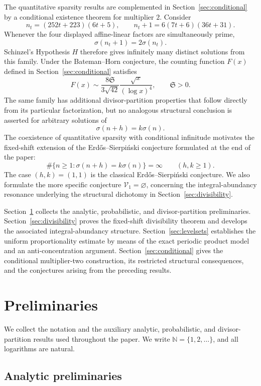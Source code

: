 \documentclass[11pt,reqno]{amsart}
\numberwithin{equation}{section}
\theoremstyle{plain}
\theoremstyle{definition}
\theoremstyle{remark}
\begin{document}
The quantitative sparsity results are complemented in Section~\ref{sec:conditional} by a conditional existence theorem for multiplier $2$. Consider
\[
n_t=(252t+223)(6t+5),
\qquad
n_t+1=6(7t+6)(36t+31).
\]
Whenever the four displayed affine-linear factors are simultaneously prime,
\[
\sigma(n_t+1)=2\sigma(n_t).
\]
Schinzel's Hypothesis $H$ therefore gives infinitely many distinct solutions from this family. Under the Bateman--Horn conjecture, the counting function $F(x)$ defined in
Section~\ref{sec:conditional} satisfies
\[
F(x)
\sim
\frac{8\mathfrak S}{3\sqrt{42}}
\frac{\sqrt{x}}{(\log x)^4},
\qquad
\mathfrak S>0.
\]
The same family has additional divisor-partition properties that follow directly from its particular factorization, but no analogous structural conclusion is asserted for arbitrary solutions of
\[
\sigma(n+h)=k\sigma(n).
\]
The coexistence of quantitative sparsity with conditional infinitude motivates the fixed-shift extension of the Erd\H{o}s--Sierpi\'nski conjecture formulated at the end of the paper:
\[
\#\{n\ge1:\sigma(n+h)=k\sigma(n)\}=\infty
\qquad(h,k\ge1).
\]
The case $(h,k)=(1,1)$ is the classical Erd\H{o}s--Sierpi\'nski conjecture. We also formulate the more specific conjecture $\mathcal V_1=\varnothing$, concerning the integral-abundancy resonance underlying the structural
dichotomy in Section~\ref{sec:divisibility}.

Section~\ref{sec:preliminaries} collects the analytic, probabilistic, and
divisor-partition preliminaries. Section~\ref{sec:divisibility} proves the fixed-shift divisibility theorem and develops the associated integral-abundancy structure. Section~\ref{sec:levelsets} establishes the uniform proportionality estimate
by means of the exact periodic product model and an anti-concentration
argument. Section~\ref{sec:conditional} gives the conditional multiplier-two construction, its restricted structural consequences, and the conjectures arising from the preceding results.

\section{Preliminaries}\label{sec:preliminaries}

We collect the notation and the auxiliary analytic, probabilistic, and divisor-partition results used throughout the paper. We write $\mathbb N=\{1,2,\ldots\}$, and all logarithms are natural.

\subsection{Analytic preliminaries}
\end{document}
